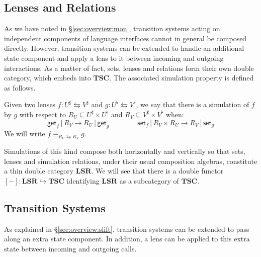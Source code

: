 \documentclass[acmsmall,screen,review,anonymous]{acmart}
\newcommand{\kw}[1]{\ensuremath{ \mathsf{#1} }}
\newcommand{\ifr}[1]{\mathrel{[{#1}]}}
\newcommand{\lensarrow}{\leftrightarrows}
\newcommand{\lensle}{\equiv}
\begin{document}
\subsection{Lenses and Relations} %

As we have noted in \S\ref{sec:overview:mon},
transition systems acting on independent components
of language interfaces
cannot in general be composed directly.
However,
transition systems can be extended to handle
an additional state component
and apply a lens to it between incoming and outgoing interactions.
As a matter of fact,
sets, lenses and relations
form their own double category,
which embeds into $\mathbf{TSC}$.
The associated simulation property
is defined as follows.

\begin{definition}
Given two lenses
$f : U^\sharp \lensarrow V^\sharp$ and
$g : U^\flat \lensarrow V^\flat$,
we say that there is a simulation of $f$ by $g$
with respect to
$R_U \subseteq U^\sharp \times U^\flat$ and 
$R_V \subseteq V^\sharp \times V^\flat$
when:
\[
  \kw{get}_f \ifr{R_V \rightarrow R_U} \kw{get}_g
  \qquad \qquad
  \kw{set}_f \ifr{R_V \times R_U \rightarrow R_V} \kw{set}_g
\]
We will write $f \lensle_{R_U \lensarrow R_V} g$.
\end{definition}

Simulations of this kind compose
both horizontally and vertically
so that sets, lenses and simulation relations,
under their usual composition algebras,
constitute a thin double category
$\mathbf{LSR}$.
We will see that there is a double functor
$[-] : \mathbf{LSR} \hookrightarrow \mathbf{TSC}$
identifying $\mathbf{LSR}$ as a subcategory of $\mathbf{TSC}$.


\subsection{Transition Systems} \label{sec:scomp:tr} %

As explained in \S\ref{sec:overview:slift},
transition systems can be extended
to pass along an extra state component.
In addition,
a lens can be applied to
this extra state between incoming and outgoing calls.
\end{document}
